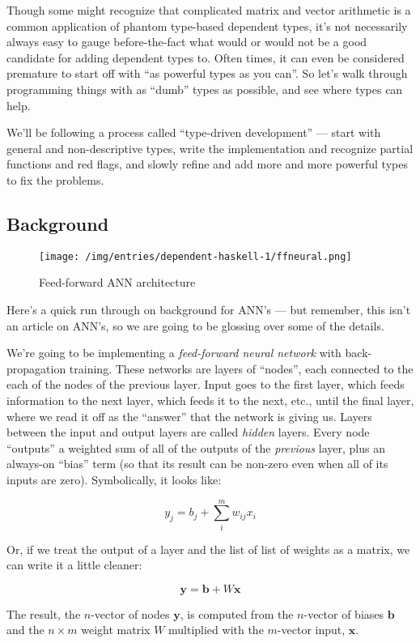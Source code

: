 \documentclass[]{article}
\begin{document}
Though some might recognize that complicated matrix and vector arithmetic is a
common application of phantom type-based dependent types, it's not necessarily
always easy to gauge before-the-fact what would or would not be a good candidate
for adding dependent types to. Often times, it can even be considered premature
to start off with ``as powerful types as you can''. So let's walk through
programming things with as ``dumb'' types as possible, and see where types can
help.

We'll be following a process called ``type-driven development'' --- start with
general and non-descriptive types, write the implementation and recognize
partial functions and red flags, and slowly refine and add more and more
powerful types to fix the problems.

\subsection{Background}\label{background}

\begin{figure}
\centering
\texttt{[image: /img/entries/dependent-haskell-1/ffneural.png]}
\caption{Feed-forward ANN architecture}
\end{figure}

Here's a quick run through on background for ANN's --- but remember, this isn't
an article on ANN's, so we are going to be glossing over some of the details.

We're going to be implementing a \emph{feed-forward neural network} with
back-propagation training. These networks are layers of ``nodes'', each
connected to the each of the nodes of the previous layer. Input goes to the
first layer, which feeds information to the next layer, which feeds it to the
next, etc., until the final layer, where we read it off as the ``answer'' that
the network is giving us. Layers between the input and output layers are called
\emph{hidden} layers. Every node ``outputs'' a weighted sum of all of the
outputs of the \emph{previous} layer, plus an always-on ``bias'' term (so that
its result can be non-zero even when all of its inputs are zero). Symbolically,
it looks like:

\[
y_j = b_j + \sum_i^m w_{ij} x_i
\]

Or, if we treat the output of a layer and the list of list of weights as a
matrix, we can write it a little cleaner:

\[
\mathbf{y} = \mathbf{b} + W \mathbf{x}
\]

The result, the \(n\)-vector of nodes \(\mathbf{y}\), is computed from the
\(n\)-vector of biases \(\mathbf{b}\) and the \(n \times m\) weight matrix \(W\)
multiplied with the \(m\)-vector input, \(\mathbf{x}\).
\end{document}
